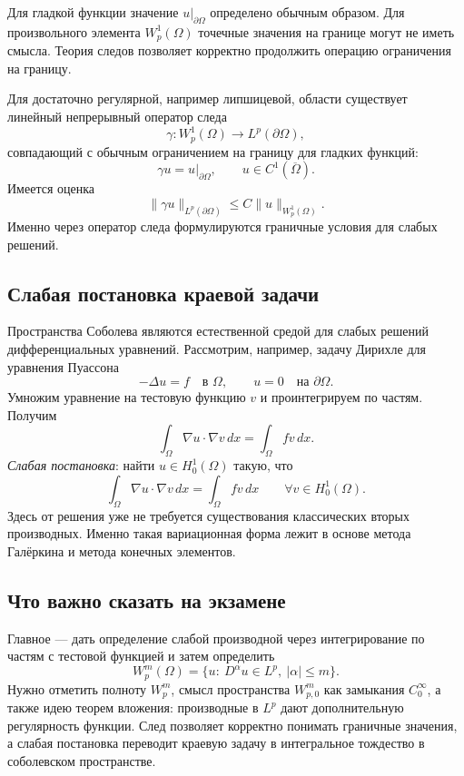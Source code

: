 Для гладкой функции значение $u|_{\partial\Omega}$ определено обычным образом.
Для произвольного элемента $W_p^1(\Omega)$ точечные значения на границе могут
не иметь смысла. Теория следов позволяет корректно продолжить операцию
ограничения на границу.

Для достаточно регулярной, например липшицевой, области существует линейный
непрерывный оператор следа
\[
    \gamma:W_p^1(\Omega)\longrightarrow L^p(\partial\Omega),
\]
совпадающий с обычным ограничением на границу для гладких функций:
\[
    \gamma u=u|_{\partial\Omega},
    \qquad u\in C^1(\overline\Omega).
\]
Имеется оценка
\[
    \|\gamma u\|_{L^p(\partial\Omega)}
    \leq C\|u\|_{W_p^1(\Omega)}.
\]
Именно через оператор следа формулируются граничные условия для слабых решений.

\subsection{Слабая постановка краевой задачи}

Пространства Соболева являются естественной средой для слабых решений
дифференциальных уравнений. Рассмотрим, например, задачу Дирихле для уравнения
Пуассона
\[
    -\Delta u=f\quad\text{в }\Omega,
    \qquad u=0\quad\text{на }\partial\Omega.
\]
Умножим уравнение на тестовую функцию $v$ и проинтегрируем по частям. Получим
\[
    \int_\Omega \nabla u\cdot\nabla v\,dx
    =\int_\Omega f v\,dx.
\]
\emph{Слабая постановка}: найти $u\in H_0^1(\Omega)$ такую, что
\[
    \int_\Omega \nabla u\cdot\nabla v\,dx
    =\int_\Omega f v\,dx
    \qquad\forall v\in H_0^1(\Omega).
\]
Здесь от решения уже не требуется существования классических вторых
производных. Именно такая вариационная форма лежит в основе метода Галёркина и
метода конечных элементов.

\subsection{Что важно сказать на экзамене}

Главное --- дать определение слабой производной через интегрирование по частям
с тестовой функцией и затем определить
\[
    W_p^m(\Omega)=\{u:\ D^\alpha u\in L^p,
    \ |\alpha|\leq m\}.
\]
Нужно отметить полноту $W_p^m$, смысл пространства $W_{p,0}^m$ как замыкания
$C_0^\infty$, а также идею теорем вложения: производные в $L^p$ дают
дополнительную регулярность функции. След позволяет корректно понимать
граничные значения, а слабая постановка переводит краевую задачу в интегральное
тождество в соболевском пространстве.

\newpage
